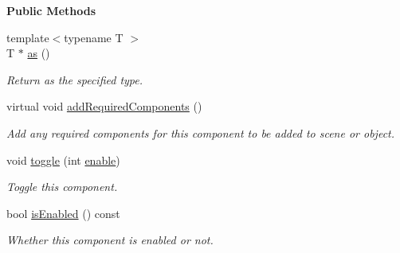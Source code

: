 \begin{Indent}\textbf{ Public Methods}\par
\begin{DoxyCompactItemize}
\item 
\mbox{\label{classrev_1_1_component_a3e6576adfc3f0d14207fa9a2270a177c}} 
{\footnotesize template$<$typename T $>$ }\\T $\ast$ \mbox{\hyperlink{classrev_1_1_component_a3e6576adfc3f0d14207fa9a2270a177c}{as}} ()
\begin{DoxyCompactList}\small\item\em Return as the specified type. \end{DoxyCompactList}\item 
\mbox{\label{classrev_1_1_component_abfb36557302212f65eef0eee1a25c759}} 
virtual void \mbox{\hyperlink{classrev_1_1_component_abfb36557302212f65eef0eee1a25c759}{add\+Required\+Components}} ()
\begin{DoxyCompactList}\small\item\em Add any required components for this component to be added to scene or object. \end{DoxyCompactList}\item 
\mbox{\label{classrev_1_1_component_a7b8395cbae3d60fea4f1e8deacbf2172}} 
void \mbox{\hyperlink{classrev_1_1_component_a7b8395cbae3d60fea4f1e8deacbf2172}{toggle}} (int \mbox{\hyperlink{classrev_1_1_component_a94ce41128edb7a839f4dbaa764174cc0}{enable}})
\begin{DoxyCompactList}\small\item\em Toggle this component. \end{DoxyCompactList}\item 
\mbox{\label{classrev_1_1_component_ada3c59429edd654f4be848c7590b503c}} 
bool \mbox{\hyperlink{classrev_1_1_component_ada3c59429edd654f4be848c7590b503c}{is\+Enabled}} () const
\begin{DoxyCompactList}\small\item\em Whether this component is enabled or not. \end{DoxyCompactList}\item 
\mbox{\label{classrev_1_1_component_a94ce41128edb7a839f4dbaa764174cc0}} 

\end{DoxyCompactItemize}
\end{Indent}
